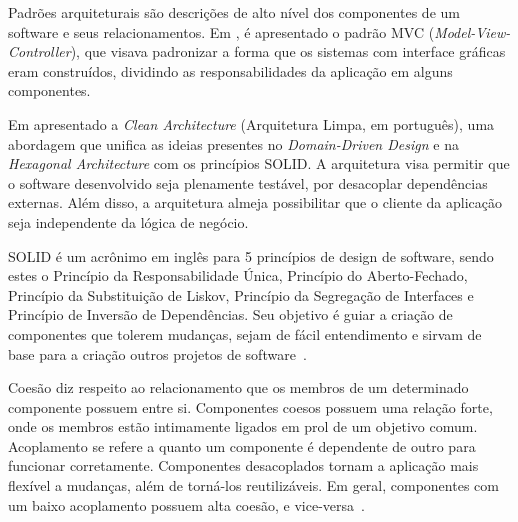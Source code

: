 Padrões arquiteturais são descrições de alto nível dos componentes de um software e seus relacionamentos.
Em \cite{mvc-paper}, é apresentado o padrão MVC (\emph{Model-View-Controller}), que visava padronizar a forma que os sistemas com interface gráficas eram construídos, dividindo as responsabilidades da aplicação em alguns componentes.

Em \cite{clean-arch-book} apresentado a \emph{Clean Architecture} (Arquitetura Limpa, em português), uma abordagem que unifica as ideias presentes no \emph{Domain-Driven Design} \cite{ddd-book} e na \emph{Hexagonal Architecture} \cite{hexagonal-arch} com os princípios SOLID.
A arquitetura visa permitir que o software desenvolvido seja plenamente testável, por desacoplar dependências externas.
Além disso, a arquitetura almeja possibilitar que o cliente da aplicação seja independente da lógica de negócio.

SOLID é um acrônimo em inglês para 5 princípios de design de software, sendo estes o Princípio da Responsabilidade Única, Princípio do Aberto-Fechado, Princípio da Substituição de Liskov, Princípio da Segregação de Interfaces e Princípio de Inversão de Dependências.
Seu objetivo é guiar a criação de componentes que tolerem mudanças, sejam de fácil entendimento e sirvam de base para a criação outros projetos de software~\cite{clean-arch-book}.

Coesão diz respeito ao relacionamento que os membros de um determinado componente possuem entre si.
Componentes coesos possuem uma relação forte, onde os membros estão intimamente ligados em prol de um objetivo comum.
Acoplamento se refere a quanto um componente é dependente de outro para funcionar corretamente.
Componentes desacoplados tornam a aplicação mais flexível a mudanças, além de torná-los reutilizáveis.
Em geral, componentes com um baixo acoplamento possuem alta coesão, e vice-versa~\cite{coupling-and-cohesion}.
